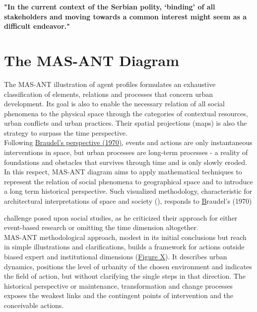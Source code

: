 \documentclass[11pt]{report}
\begin{document}
{\textbf{"In the current context  of  the  Serbian  polity,  ‘binding’  of  all stakeholders  and  moving  towards  a  common interest  might  seem  as  a  difficult  endeavor."} \href{Volic}{\cite{VolicEtAl.2012}}



\section{The MAS-ANT Diagram}

The MAS-ANT illustration of agent profiles formulates an exhaustive classification of elements, relations and processes that concern urban development.
Its goal is also to enable the necessary relation of all social phenomena to the physical space through the categories of contextual resources, urban conflicts and urban practices.
Their spatial projections (maps) is also the strategy to surpass the time perspective.
\\

Following \href{Braudel}{Braudel's perspective (1970)}, events and actions are only instantaneous interventions in space, but urban processes are long-term processes - a reality of foundations and obstacles that survives through time and is only slowly eroded.
In this respect, MAS-ANT diagram aims to apply mathematical  techniques to represent the  relation of social phenomena  to  geographical space and to introduce a  long term historical perspective.
Such visualized methodology, characteristic for architectural interpretations of space and society (\href{X}{\cite{????}}), responds to \href{Braudel}Braudel's (1970)} challenge posed upon social studies, as he criticized their approach for either event-based research or omitting the time dimension altogether.
\\

MAS-ANT methodological approach, modest in its initial conclusions but reach in simple illustrations and clarifications, builds a framework for actions outside biased expert and institutional dimensions (\href{Diagram}{Figure X}).
It describes urban dynamics, positions the level of urbanity of the chosen environment and indicates the field of action, but without clarifying the single steps in that direction.
The historical perspective or maintenance, transformation and change processes exposes the weakest links and the contingent points of intervention and the conceivable actions. 
\\
\end{document}
